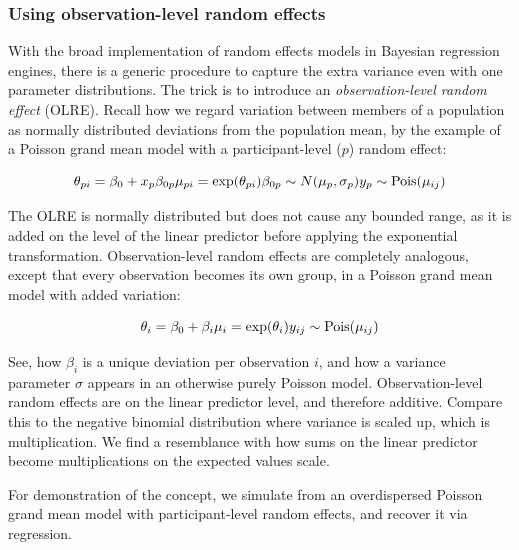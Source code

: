 \documentclass[]{svmono}
\begin{document}
\subsubsection{Using observation-level random
effects}\label{using-observation-level-random-effects}

With the broad implementation of random effects models in Bayesian
regression engines, there is a generic procedure to capture the extra
variance even with one parameter distributions. The trick is to
introduce an \emph{observation-level random effect} (OLRE). Recall how
we regard variation between members of a population as normally
distributed deviations from the population mean, by the example of a
Poisson grand mean model with a participant-level (\(p\)) random effect:

\[
\theta_{pi} = \beta_0 + x_p\beta_{0p} \\
\mu_{pi} = \exp(\theta_{pi})\\
\beta_{0p} \sim N(\mu_{p}, \sigma_p)\\
y_{p} \sim \textrm{Pois}(\mu_{ij})
\]

The OLRE is normally distributed but does not cause any bounded range,
as it is added on the level of the linear predictor before applying the
exponential transformation. Observation-level random effects are
completely analogous, except that every observation becomes its own
group, in a Poisson grand mean model with added variation:

\[
\theta_{i} = \beta_0 + \beta_{i} \\
\mu_i = \exp(\theta_i)\\
y_{ij} \sim \textrm{Pois}(\mu_{ij})
\]

See, how \(\beta_i\) is a unique deviation per observation \(i\), and
how a variance parameter \(\sigma\) appears in an otherwise purely
Poisson model. Observation-level random effects are on the linear
predictor level, and therefore additive. Compare this to the negative
binomial distribution where variance is scaled up, which is
multiplication. We find a resemblance with how sums on the linear
predictor become multiplications on the expected values scale.

For demonstration of the concept, we simulate from an overdispersed
Poisson grand mean model with participant-level random effects, and
recover it via regression.
\end{document}
